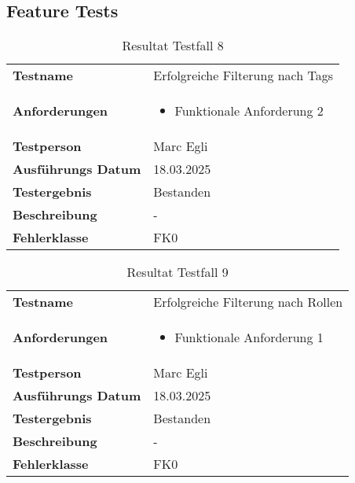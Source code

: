 \subsection{Feature Tests}

\begin{table}[H]
    \begin{tabular}{|L{0.3\textwidth}|L{0.65\textwidth}|}
        \hline
           \\[10pt]
        \hline
        \textbf{Testname} & Erfolgreiche Filterung nach Tags \\
        \hline
        \textbf{Anforderungen} & 
        \begin{itemize}
            \item Funktionale Anforderung 2
        \end{itemize} \\
        \hline
        \textbf{Testperson} & Marc Egli \\
        \hline
        \textbf{Ausführungs Datum} & 18.03.2025 \\
        \hline
        \textbf{Testergebnis} & Bestanden \\
        \hline
        \textbf{Beschreibung} & - \\ 
        \hline
        \textbf{Fehlerklasse} & FK0 \\ 
        \hline
    \end{tabular}
    \caption{Resultat Testfall 8}
\end{table}

\begin{table}[H]
    \begin{tabular}{|L{0.3\textwidth}|L{0.65\textwidth}|}
        \hline
           \\[10pt]
        \hline
        \textbf{Testname} & Erfolgreiche Filterung nach Rollen \\
        \hline
        \textbf{Anforderungen} & 
        \begin{itemize}
            \item Funktionale Anforderung 1
        \end{itemize} \\
        \hline
        \textbf{Testperson} & Marc Egli \\
        \hline
        \textbf{Ausführungs Datum} & 18.03.2025 \\
        \hline
        \textbf{Testergebnis} & Bestanden \\
        \hline
        \textbf{Beschreibung} & - \\ 
        \hline
        \textbf{Fehlerklasse} & FK0 \\ 
        \hline
    \end{tabular}
    \caption{Resultat Testfall 9}
\end{table}

